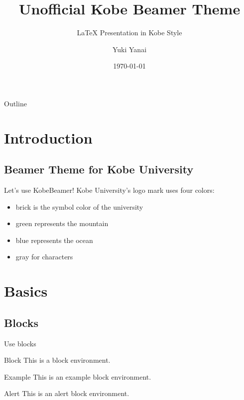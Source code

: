 \documentclass[dvipdfmx]{beamer}
\title[KobeBeamer]{Unofficial Kobe Beamer Theme}
\subtitle{{\LaTeX} Presentation in Kobe Style}
\author[Yanai]{Yuki Yanai}
\institute{Graduate School of Law}
\date{\today}
\begin{document}
\begin{frame}
 \maketitle
\end{frame}

\begin{frame}{Outline} 
  \tableofcontents
\end{frame}

\section{Introduction}
\subsection{Beamer Theme for Kobe University}

\begin{frame}{Let's use KobeBeamer!}
  Kobe University's logo mark uses four colors:
  \begin{itemize}
    \item \textcolor{kobebrick}{brick} is the symbol color of the university
    \item \textcolor{kobegreen}{green} represents the mountain
    \item \textcolor{kobeblue}{blue} represents the ocean
    \item \textcolor{kobegray}{gray} for characters   
  \end{itemize}
\end{frame}



\section{Basics}


\subsection{Blocks}

\begin{frame}{Use blocks}
  \begin{block}{Block}
   This is a block environment.
  \end{block}
  \pause
  \begin{exampleblock}{Example}
   This is an example block environment.
  \end{exampleblock}
 \pause
  \begin{alertblock}{Alert}
   This is an alert block environment.
  \end{alertblock}
\end{frame}
\end{document}
